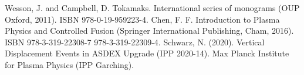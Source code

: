 \documentclass[smallextended]{svjour3}
\begin{document}

\begin{thebibliography}{}
%
%
Wesson, J. and Campbell, D. Tokamaks. International series of monograms (OUP
Oxford, 2011). ISBN 978-0-19-959223-4.
 Chen, F. F. Introduction to Plasma Physics and Controlled Fusion (Springer International Publishing, Cham, 2016). ISBN 978-3-319-22308-7 978-3-319-22309-4.
Schwarz, N. (2020). Vertical Displacement Events in ASDEX Upgrade (IPP 2020-14). Max Planck Institute for Plasma Physics (IPP Garching).
\end{thebibliography}
\end{document}
